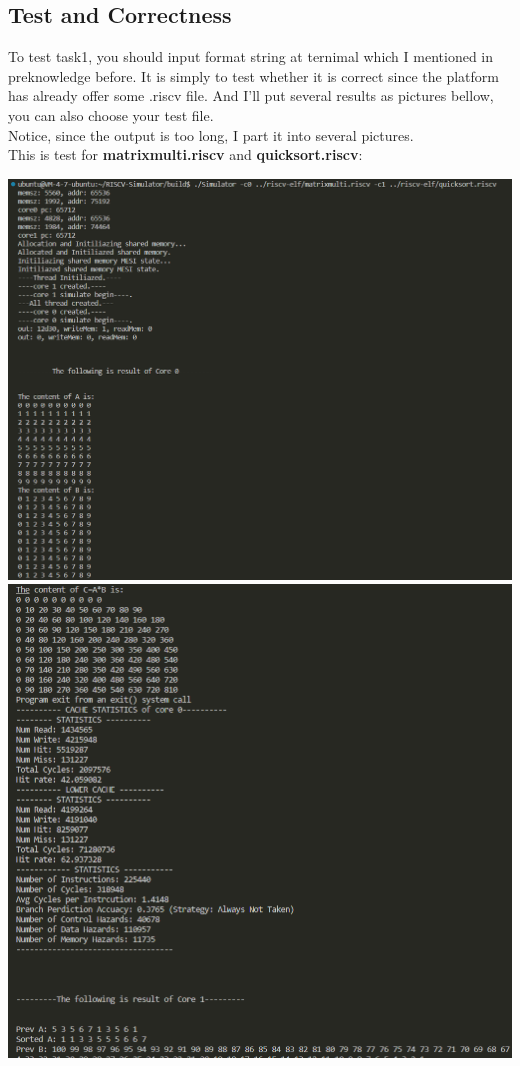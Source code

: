 \mathbb{R} \documentclass{article}
\begin{document}
\subsection{Test and Correctness}
To test task1, you should input format string at ternimal which I mentioned in preknowledge before. It is simply to test whether it is correct since the platform has already offer some .riscv file. And I'll put several results as pictures bellow, you can also choose your test file.\\
Notice, since the output is too long, I part it into several pictures.\\
This is test for \textbf{matrixmulti.riscv} and \textbf{quicksort.riscv}:\\
\begin{center}
  \includegraphics[scale = 0.3]{1.png}
  \includegraphics[scale = 0.3]{2.png}

\end{center}
\end{document}
